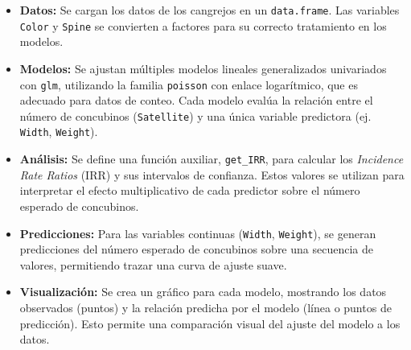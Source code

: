 \begin{itemize}
    \item \textbf{Datos:} Se cargan los datos de los cangrejos en un \texttt{data.frame}. Las variables \texttt{Color} y \texttt{Spine} se convierten a factores para su correcto tratamiento en los modelos.

    \item \textbf{Modelos:} Se ajustan múltiples modelos lineales generalizados univariados con \texttt{glm}, utilizando la familia \texttt{poisson} con enlace logarítmico, que es adecuado para datos de conteo. Cada modelo evalúa la relación entre el número de concubinos (\texttt{Satellite}) y una única variable predictora (ej. \texttt{Width}, \texttt{Weight}).

    \item \textbf{Análisis:} Se define una función auxiliar, \texttt{get\_IRR}, para calcular los \textit{Incidence Rate Ratios} (IRR) y sus intervalos de confianza. Estos valores se utilizan para interpretar el efecto multiplicativo de cada predictor sobre el número esperado de concubinos.

    \item \textbf{Predicciones:} Para las variables continuas (\texttt{Width}, \texttt{Weight}), se generan predicciones del número esperado de concubinos sobre una secuencia de valores, permitiendo trazar una curva de ajuste suave.

    \item \textbf{Visualización:} Se crea un gráfico para cada modelo, mostrando los datos observados (puntos) y la relación predicha por el modelo (línea o puntos de predicción). Esto permite una comparación visual del ajuste del modelo a los datos.
\end{itemize}

\clearpage









